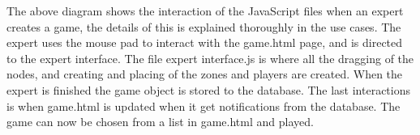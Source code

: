 The above diagram shows the interaction of the JavaScript files when an expert creates a game, the details of this is explained thoroughly in the use cases. The expert uses the mouse pad to interact with the game.html page, and is directed to the expert interface. The file expert interface.js is where all the dragging of the nodes, and creating and placing of the zones and players are created. When the expert is finished the game object is stored to the database. The last interactions is when game.html is updated when it get notifications from the database. The game can now be chosen from a list in game.html and played. 

